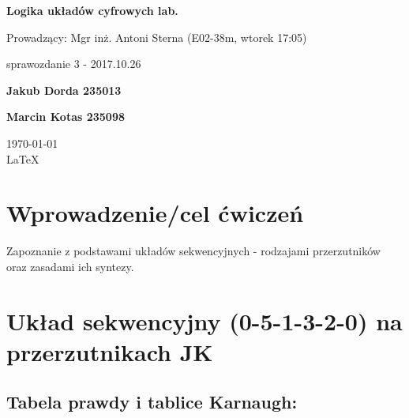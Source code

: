 \documentclass[12pt,a4paper]{article}
\begin{document}
	
	\begin{titlepage}
		
		\centering
		{\huge\bfseries Logika układów cyfrowych lab.\par}
		
		\vspace{0.5cm}
		Prowadzący: Mgr inż. Antoni Sterna (E02-38m, wtorek 17:05) \\
	
		\vspace{1.1cm}
		{\Large sprawozdanie 3 - 2017.10.26\par}
		\vfill
		
		{\large\bfseries Jakub Dorda 235013\par}
		{\large\bfseries Marcin Kotas 235098\par}
		
		\vspace{1cm}
		\today \\ \LaTeX
		
		\restoregeometry
	\end{titlepage}

	
	\section{Wprowadzenie/cel ćwiczeń}
	
	Zapoznanie z podstawami układów sekwencyjnych - rodzajami przerzutników oraz zasadami ich syntezy.
		
	\section{Układ sekwencyjny (0-5-1-3-2-0) na przerzutnikach JK}
		
		\subsection{Tabela prawdy i tablice Karnaugh:}
			
\end{document}
